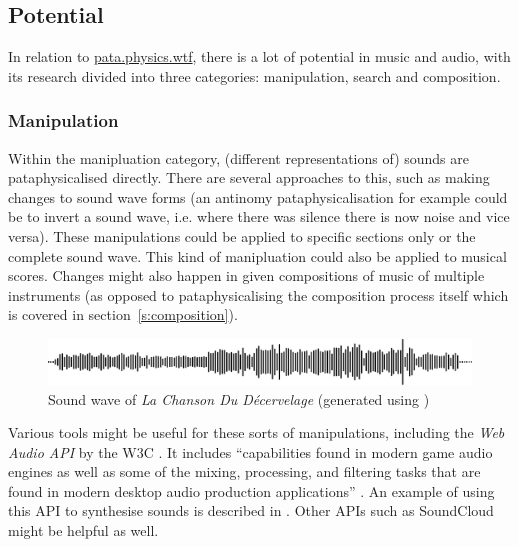 \subsection{Potential}
\label{s:potential}

In relation to \url{pata.physics.wtf}, there is a lot of potential in music and audio, with its research divided into three categories: manipulation, search and composition. 


\subsubsection{Manipulation}

Within the manipluation category, (different representations of) sounds are pataphysicalised directly. There are several approaches to this, such as making changes to sound wave forms (an antinomy pataphysicalisation for example could be to invert a sound wave, i.e. where there was silence there is now noise and vice versa). These manipulations could be applied to specific sections only or the complete sound wave. This kind of manipluation could also be applied to musical scores. Changes might also happen in given compositions of music of multiple instruments (as opposed to pataphysicalising the composition process itself which is covered in section~\ref{s:composition}).

\begin{figure}[!htbp]
\centering
  \includegraphics[width=\linewidth]{simplewave.pdf}
\caption[Sound wave of \textit{La Chanson Du D{\'e}cervelage}]{Sound wave of \textit{La Chanson Du D{\'e}cervelage} \autocite[][Track 1]{UbuWebPata} (generated using \autocite{Heesakkersnd})}
\end{figure}

Various tools might be useful for these sorts of manipulations, including the \textit{Web Audio API} by the \ac{W3C} \autocite{Adenot2017}. It includes ``capabilities found in modern game audio engines as well as some of the mixing, processing, and filtering tasks that are found in modern desktop audio production applications'' \autocite*{Adenot2017}. An example of using this API to synthesise sounds is described in \autocite{Misuary2016}. Other \ac{API}s such as SoundCloud \autocite{soundcloud} might be helpful as well. 

